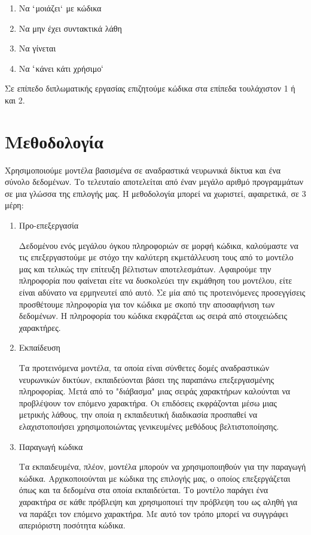 \begin{enumerate}
\item Να $`$μοιάζει$`$ με κώδικα
\item Να μην έχει συντακτικά λάθη
\item Να γίνεται  %
\item Να $`$κάνει κάτι χρήσιμο$`$
\end{enumerate}

Σε επίπεδο διπλωματικής εργασίας επιζητούμε κώδικα στα επίπεδα τουλάχιστον 1 ή και 2.


\section{Μεθοδολογία}
Χρησιμοποιούμε μοντέλα βασισμένα σε αναδραστικά νευρωνικά δίκτυα και ένα σύνολο δεδομένων. Το τελευταίο αποτελείται από έναν μεγάλο αριθμό προγραμμάτων σε μια γλώσσα της επιλογής μας. Η μεθοδολογία μπορεί να χωριστεί, αφαιρετικά, σε 3 μέρη:

\begin{enumerate}
\item Προ-επεξεργασία 

Δεδομένου ενός μεγάλου όγκου πληροφοριών σε μορφή κώδικα, καλούμαστε να τις επεξεργαστούμε με στόχο την καλύτερη εκμετάλλευση τους από το μοντέλο μας και τελικώς την επίτευξη βέλτιστων αποτελεσμάτων. Αφαιρούμε την πληροφορία που φαίνεται είτε να δυσκολεύει την εκμάθηση του μοντέλου, είτε είναι αδύνατο να ερμηνευτεί από αυτό. Σε μία από τις προτεινόμενες προσεγγίσεις προσθέτουμε πληροφορία για τον κώδικα με σκοπό την αποσαφήνιση των δεδομένων. Η πληροφορία του κώδικα εκφράζεται ως σειρά από στοιχειώδεις χαρακτήρες.

\item Εκπαίδευση

Τα προτεινόμενα μοντέλα, τα οποία είναι σύνθετες δομές αναδραστικών νευρωνικών δικτύων, εκπαιδεύονται βάσει της παραπάνω επεξεργασμένης πληροφορίας. Μετά από το "διάβασμα" μιας σειράς χαρακτήρων καλούνται να προβλέψουν τον επόμενο χαρακτήρα. Οι επιδόσεις εκφράζονται μέσω μιας μετρικής λάθους, την οποία η εκπαιδευτική διαδικασία προσπαθεί να ελαχιστοποιήσει χρησιμοποιώντας γενικευμένες μεθόδους βελτιστοποίησης.  


\item Παραγωγή κώδικα

Τα εκπαιδευμένα, πλέον, μοντέλα μπορούν να χρησιμοποιηθούν για την παραγωγή κώδικα. Αρχικοποιούνται με κώδικα της επιλογής μας, ο οποίος επεξεργάζεται όπως και τα δεδομένα στα οποία εκπαιδεύεται. Το μοντέλο παράγει ένα χαρακτήρα σε κάθε πρόβλεψη και χρησιμοποιεί την πρόβλεψη του ως αληθή για να παράξει τον επόμενο χαρακτήρα. Με αυτό τον τρόπο μπορεί να συγγράφει απεριόριστη ποσότητα κώδικα.
\end{enumerate}

